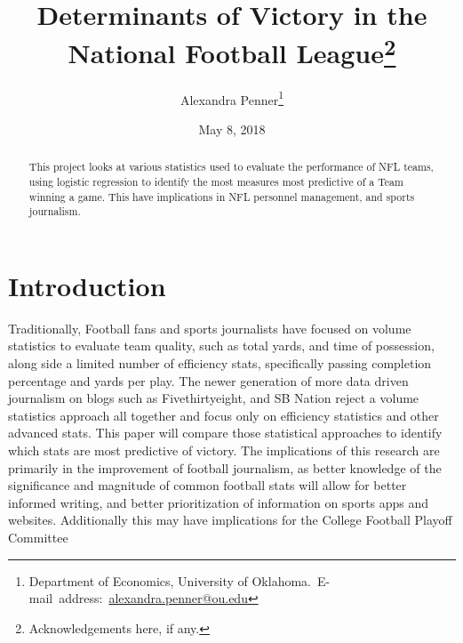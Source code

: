 \documentclass[12pt,english]{article}
\begin{document}
\begin{singlespace}
\title{Determinants of Victory in the National Football League\thanks{Acknowledgements here, if any.}}
\end{singlespace}

\author{Alexandra Penner\thanks{Department of Economics, University of Oklahoma.\
E-mail~address:~\href{mailto:alexandra.penner@ou.edu}{alexandra.penner@ou.edu}}}

\date{May 8, 2018}

\maketitle

\begin{abstract}
\begin{singlespace}
This project looks at various statistics used to evaluate the performance of NFL teams, using logistic regression to identify the most measures most predictive of a Team winning a game.  This have implications in NFL personnel management, and sports journalism.
\end{singlespace}

\end{abstract}
\vfill{}


\pagebreak{}



\section{Introduction}
Traditionally, Football fans and sports journalists have focused on volume statistics to evaluate team quality, such as total yards, and time of possession, along side a limited number of efficiency stats, specifically passing completion percentage and yards per play.  The newer generation of more data driven journalism on blogs such as Fivethirtyeight, and SB Nation reject a volume statistics approach all together and focus only on efficiency statistics and other advanced stats.  This paper will compare those statistical approaches to identify which stats are most predictive of victory.  The implications of this research are primarily in the improvement of football journalism, as better knowledge of the significance and magnitude of common football stats will allow for better informed writing, and better prioritization of information on sports apps and websites. Additionally this may have implications for the College Football Playoff Committee
\end{document}
